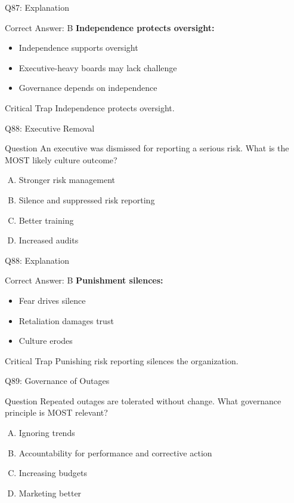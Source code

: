 \documentclass{beamer}
\begin{document}
	\begin{frame}{Q87: Explanation}
		\begin{block}{Correct Answer: B}
			\textbf{Independence protects oversight:}
			\begin{itemize}
				\item Independence supports oversight
				\item Executive-heavy boards may lack challenge
				\item Governance depends on independence
			\end{itemize}
		\end{block}
		\begin{alertblock}{Critical Trap}
			Independence protects oversight.
		\end{alertblock}
	\end{frame}
	
	\begin{frame}{Q88: Executive Removal}
		\begin{block}{Question}
			An executive was dismissed for reporting a serious risk. What is the MOST likely culture outcome?
		\end{block}
		\begin{enumerate}[(A)]
			\item Stronger risk management
			\item Silence and suppressed risk reporting
			\item Better training
			\item Increased audits
		\end{enumerate}
	\end{frame}
	
	\begin{frame}{Q88: Explanation}
		\begin{block}{Correct Answer: B}
			\textbf{Punishment silences:}
			\begin{itemize}
				\item Fear drives silence
				\item Retaliation damages trust
				\item Culture erodes
			\end{itemize}
		\end{block}
		\begin{alertblock}{Critical Trap}
			Punishing risk reporting silences the organization.
		\end{alertblock}
	\end{frame}
	
	\begin{frame}{Q89: Governance of Outages}
		\begin{block}{Question}
			Repeated outages are tolerated without change. What governance principle is MOST relevant?
		\end{block}
		\begin{enumerate}[(A)]
			\item Ignoring trends
			\item Accountability for performance and corrective action
			\item Increasing budgets
			\item Marketing better
		\end{enumerate}
	\end{frame}
	
\end{document}
